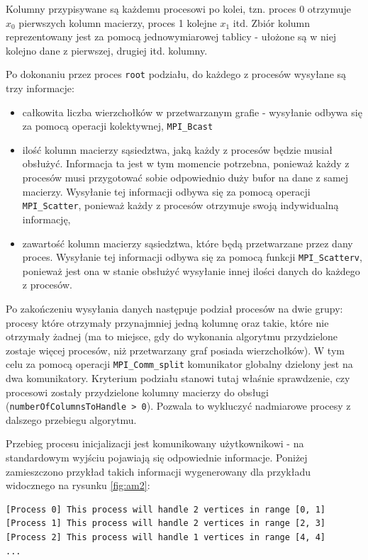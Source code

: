 \documentclass[12pt]{article}
\begin{document}
Kolumny przypisywane są każdemu procesowi po kolei, tzn. proces 0 otrzymuje $x_0$ pierwszych kolumn macierzy, proces 1 kolejne $x_1$ itd. Zbiór kolumn reprezentowany jest za pomocą jednowymiarowej tablicy - ułożone są w niej kolejno dane z pierwszej, drugiej itd. kolumny.

\newpage
Po dokonaniu przez proces \lstinline{root} podziału, do każdego z procesów wysyłane są trzy informacje:
\begin{itemize}
\item całkowita liczba wierzchołków w przetwarzanym grafie - wysyłanie odbywa się za pomocą operacji kolektywnej, \lstinline{MPI_Bcast}
\item ilość kolumn macierzy sąsiedztwa, jaką każdy z procesów będzie musiał obsłużyć. Informacja ta jest w tym momencie potrzebna, ponieważ każdy z procesów musi przygotować sobie odpowiednio duży bufor na dane z samej macierzy. Wysyłanie tej informacji odbywa się za pomocą operacji \lstinline{MPI_Scatter}, ponieważ każdy z procesów otrzymuje swoją indywidualną informację,
\item zawartość kolumn macierzy sąsiedztwa, które będą przetwarzane przez dany proces. Wysyłanie tej informacji odbywa się za pomocą funkcji \lstinline{MPI_Scatterv}, ponieważ jest ona w stanie obsłużyć wysyłanie innej ilości danych do każdego z procesów.
\end{itemize}

Po zakończeniu wysyłania danych następuje podział procesów na dwie grupy: procesy które otrzymały przynajmniej jedną kolumnę oraz takie, które nie otrzymały żadnej (ma to miejsce, gdy do wykonania algorytmu przydzielone zostaje więcej procesów, niż przetwarzany graf posiada wierzchołków). W tym celu za pomocą operacji \lstinline{MPI_Comm_split} komunikator globalny dzielony jest na dwa komunikatory. Kryterium podziału stanowi tutaj właśnie sprawdzenie, czy procesowi zostały przydzielone kolumny macierzy do obsługi (\lstinline{numberOfColumnsToHandle > 0}). Pozwala to wykluczyć nadmiarowe procesy z dalszego przebiegu algorytmu.

\vspace{5mm}
Przebieg procesu inicjalizacji jest komunikowany użytkownikowi - na standardowym wyjściu pojawiają się odpowiednie informacje. Poniżej zamieszczono przykład takich informacji wygenerowany dla przykładu widocznego na rysunku \ref{fig:am2}:

\begin{lstlisting}
[Process 0] This process will handle 2 vertices in range [0, 1]
[Process 1] This process will handle 2 vertices in range [2, 3]
[Process 2] This process will handle 1 vertices in range [4, 4]
...
\end{lstlisting}
\end{document}
